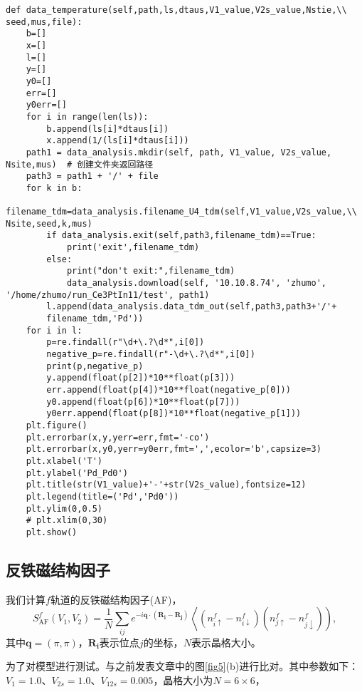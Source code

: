 \begin{lstlisting}
def data_temperature(self,path,ls,dtaus,V1_value,V2s_value,Nstie,\\ seed,mus,file):
    b=[]
    x=[]
    l=[]
    y=[]
    y0=[]
    err=[]
    y0err=[]
    for i in range(len(ls)):
        b.append(ls[i]*dtaus[i])
        x.append(1/(ls[i]*dtaus[i]))
    path1 = data_analysis.mkdir(self, path, V1_value, V2s_value, Nsite,mus)  # 创建文件夹返回路径
    path3 = path1 + '/' + file
    for k in b:
        filename_tdm=data_analysis.filename_U4_tdm(self,V1_value,V2s_value,\\ Nsite,seed,k,mus)
        if data_analysis.exit(self,path3,filename_tdm)==True:
            print('exit',filename_tdm)
        else:
            print("don't exit:",filename_tdm)
            data_analysis.download(self, '10.10.8.74', 'zhumo', '/home/zhumo/run_Ce3PtIn11/test', path1)
        l.append(data_analysis.data_tdm_out(self,path3,path3+'/'+
        filename_tdm,'Pd'))
    for i in l:
        p=re.findall(r"\d+\.?\d*",i[0])
        negative_p=re.findall(r"-\d+\.?\d*",i[0])
        print(p,negative_p)
        y.append(float(p[2])*10**float(p[3]))
        err.append(float(p[4])*10**float(negative_p[0]))
        y0.append(float(p[6])*10**float(p[7]))
        y0err.append(float(p[8])*10**float(negative_p[1]))
    plt.figure()
    plt.errorbar(x,y,yerr=err,fmt='-co')
    plt.errorbar(x,y0,yerr=y0err,fmt=',',ecolor='b',capsize=3)
    plt.xlabel('T')
    plt.ylabel('Pd_Pd0')
    plt.title(str(V1_value)+'-'+str(V2s_value),fontsize=12)
    plt.legend(title=('Pd','Pd0'))
    plt.ylim(0,0.5)
    # plt.xlim(0,30)
    plt.show()
\end{lstlisting}



\subsection{反铁磁结构因子}%
我们计算$f$轨道的反铁磁结构因子(AF)，
$$
S_{\mathrm{AF}}^{f}\left(V_{1}, V_{2}\right)=\frac{1}{N} \sum_{i j} e^{-i \mathbf{q} \cdot\left(\mathbf{R}_{\mathbf{i}}-\mathbf{R}_{\mathbf{j}}\right)}\left\langle\left(n_{i \uparrow}^{f}-n_{i \downarrow}^{f}\right)\left(n_{j \uparrow}^{f}-n_{j \downarrow}^{f}\right)\right),
$$
其中$\mathbf{q}=(\pi,\pi)$，$\mathbf{R_i}$表示位点$j$的坐标，$N$表示晶格大小。

为了对模型进行测试。与之前发表文章中的图\ref{fig5}(b)进行比对。其中参数如下：$V_1=1.0$、$V_{2s}=1.0$、$V_{12s}=0.005$，晶格大小为$N=6 \times 6$，


